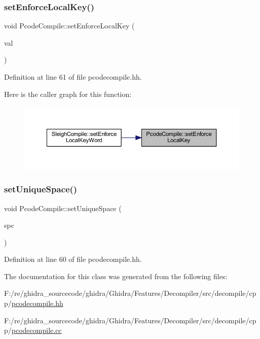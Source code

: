 \subsubsection{\texorpdfstring{setEnforceLocalKey()}{setEnforceLocalKey()}}
{\footnotesize\ttfamily void Pcode\+Compile\+::set\+Enforce\+Local\+Key (\begin{DoxyParamCaption}\item[{bool}]{val }\end{DoxyParamCaption})\hspace{0.3cm}{\ttfamily [inline]}}



Definition at line 61 of file pcodecompile.\+hh.

Here is the caller graph for this function\+:
\nopagebreak
\begin{figure}[H]
\begin{center}
\leavevmode
\includegraphics[width=350pt]{class_pcode_compile_adfc1e533f15be38cb5169f00bc4d0f2f_icgraph}
\end{center}
\end{figure}
\mbox{\label{class_pcode_compile_a18b718ada4ad4122a2fe7da86490df92}} 
\subsubsection{\texorpdfstring{setUniqueSpace()}{setUniqueSpace()}}
{\footnotesize\ttfamily void Pcode\+Compile\+::set\+Unique\+Space (\begin{DoxyParamCaption}\item[{\mbox{\hyperlink{class_addr_space}{Addr\+Space}} $\ast$}]{spc }\end{DoxyParamCaption})\hspace{0.3cm}{\ttfamily [inline]}}



Definition at line 60 of file pcodecompile.\+hh.



The documentation for this class was generated from the following files\+:\begin{DoxyCompactItemize}
\item 
F\+:/re/ghidra\+\_\+sourcecode/ghidra/\+Ghidra/\+Features/\+Decompiler/src/decompile/cpp/\mbox{\hyperlink{pcodecompile_8hh}{pcodecompile.\+hh}}\item 
F\+:/re/ghidra\+\_\+sourcecode/ghidra/\+Ghidra/\+Features/\+Decompiler/src/decompile/cpp/\mbox{\hyperlink{pcodecompile_8cc}{pcodecompile.\+cc}}\end{DoxyCompactItemize}
